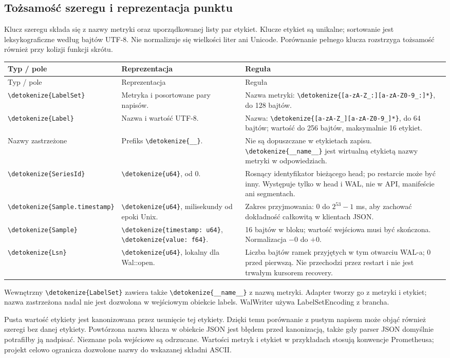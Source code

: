 \documentclass[11pt,a4paper]{article}
\newcommand{\code}[1]{\expandafter\nolinkurl\expandafter{\detokenize{#1}}}
\newcommand{\tabhead}[1]{\toprule #1\\ \midrule\endfirsthead
  \toprule #1\\ \midrule\endhead \bottomrule\endfoot}
\begin{document}
\subsection{Tożsamość szeregu i reprezentacja punktu}
Klucz szeregu składa się z nazwy metryki oraz uporządkowanej listy par
etykiet. Klucze etykiet są unikalne; sortowanie jest leksykograficzne
według bajtów UTF-8. Nie normalizuje się wielkości liter ani Unicode.
Porównanie pełnego klucza rozstrzyga tożsamość również przy kolizji
funkcji skrótu.

\begin{longtable}{P{32mm}P{46mm}P{78mm}}
\tabhead{Typ / pole & Reprezentacja & Reguła}
\code{LabelSet} & Metryka i posortowane pary napisów. &
Nazwa metryki: \code{[a-zA-Z_:][a-zA-Z0-9_:]*}, do 128 bajtów.\\
\code{Label} & Nazwa i wartość UTF-8. &
Nazwa: \code{[a-zA-Z_][a-zA-Z0-9_]*}, do 64 bajtów;
wartość do 256 bajtów, maksymalnie 16 etykiet.\\
Nazwy zastrzeżone & Prefiks \code{__}. &
Nie są dopuszczane w etykietach zapisu. \code{__name__} jest wirtualną
etykietą nazwy metryki w odpowiedziach.\\
\code{SeriesId} & \code{u64}, od 0. &
Rosnący identyfikator bieżącego head; po restarcie może być inny.
Występuje tylko w head i WAL, nie w API, manifeście ani segmentach.\\
\code{Sample.timestamp} & \code{u64}, milisekundy od epoki Unix. &
Zakres przyjmowania: $0$ do $2^{53}-1$ ms, aby zachować dokładność
całkowitą w klientach JSON.\\
\code{Sample} & \code{timestamp: u64}, \code{value: f64}. &
16 bajtów w bloku; wartość wejściowa musi być skończona.
Normalizacja $-0$ do $+0$.\\
\code{Lsn} & \code{u64}, lokalny dla Wal::open. &
Liczba bajtów ramek przyjętych w tym otwarciu WAL-a; 0 przed pierwszą.
Nie przechodzi przez restart i nie jest trwałym kursorem recovery.\\

\end{longtable}

Wewnętrzny \code{LabelSet} zawiera także \code{__name__} z nazwą metryki.
Adapter tworzy go z metryki i etykiet; nazwa zastrzeżona nadal nie jest dozwolona
w wejściowym obiekcie labels. WalWriter używa LabelSetEncoding z brancha.

Pusta wartość etykiety jest kanonizowana przez usunięcie tej etykiety.
Dzięki temu porównanie z pustym napisem może objąć również szeregi
bez danej etykiety. Powtórzona nazwa klucza w obiekcie JSON jest błędem
przed kanonizacją, także gdy parser JSON domyślnie potrafiłby ją nadpisać.
Nieznane pola wejściowe są odrzucane. Wartości metryk i etykiet
w przykładach stosują konwencje Prometheusa; projekt celowo ogranicza
dozwolone nazwy do wskazanej składni ASCII.
\end{document}
